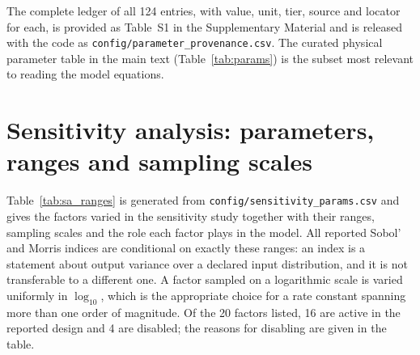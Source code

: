 The complete ledger of all 124 entries, with value, unit, tier, source and
locator for each, is provided as Table~S1 in the Supplementary Material and is
released with the code as \texttt{config/parameter\_provenance.csv}. The curated
physical parameter table in the main text (Table~\ref{tab:params}) is the subset
most relevant to reading the model equations.

\section{Sensitivity analysis: parameters, ranges and sampling scales}
\label{app:sa}

Table~\ref{tab:sa_ranges} is generated from
\texttt{config/sensitivity\_params.csv} and gives the factors varied in the
sensitivity study together with their ranges, sampling scales and the role each
factor plays in the model. All reported Sobol' and Morris indices are conditional
on exactly these ranges: an index is a statement about output variance over a
declared input distribution, and it is not transferable to a different one. A
factor sampled on a logarithmic scale is varied uniformly in $\log_{10}$, which
is the appropriate choice for a rate constant spanning more than one order of
magnitude. Of the 20 factors listed, 16 are active in the reported design and 4
are disabled; the reasons for disabling are given in the table.

